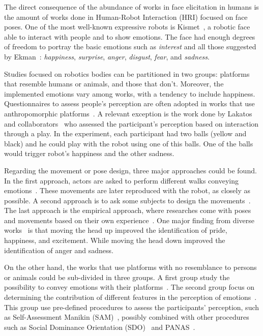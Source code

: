 The direct consequence of the abundance of works in face elicitation in humans is the amount of works done in Human-Robot Interaction (HRI) focused on face poses. One of the most well-known expressive robots is Kismet~\cite{Breazeal2002}, a robotic face able to interact with people and to show emotions. The face had enough degrees of freedom to portray the basic emotions such as \textit{interest} and all those suggested by Ekman~\cite{Ekman2004}: \textit{happiness}, \textit{surprise}, \textit{anger}, \textit{disgust}, \textit{fear}, and \textit{sadness}.

Studies focused on robotics bodies can be partitioned in two groups: platforms that resemble humans or animals, and those that don't. Moreover, the implemented emotions vary among works, with a tendency to include happiness. Questionnaires to assess people's perception are often adopted in works that use anthropomorphic platforms~\cite{Canamero2010,Beck2010,Li2011,Destephe2013b,Arras2012,Brown2014}. A relevant exception is the work done by Lakatos and collaborators~\cite{Lakatos2014} who assessed the participant's perception based on interaction through a play. In the experiment, each participant had two balls (yellow and black) and he could play with the robot using one of this balls. One of the balls would trigger robot's happiness and the other sadness. 

Regarding the movement or pose design, three major approaches could be found. In the first approach, actors are asked to perform different walks conveying emotions~\cite{Destephe2013b}. These movements are later reproduced with the robot, as closely as possible. A second approach is to ask some subjects to design the movements~\cite{Li2011}. The last approach is the empirical approach, where researches come with poses and movements based on their own experience~\cite{Canamero2010,Beck2010,Arras2012,Brown2014}. One major finding from diverse works~\cite{Canamero2010,Beck2010,Brown2014} is that moving the head up improved the identification of pride, happiness, and excitement. While moving the head down improved the identification of anger and sadness.  

On the other hand, the works that use platforms with no resemblance to persons or animals could be sub-divided in three groups. A first group study the possibility to convey emotions with their platforms~\cite{Arras2012, Novika2015, BarakovaL10}. The second group focus on determining the contribution of different features in the perception of emotions~\cite{Saerbeck2010,Barakova2013, Sharma2013, NAM2014}.
This group use pre-defined procedures to assess the participants' perception, such as Self-Assessment Manikin (SAM)~\cite{Lang2008}, possibly combined  with other procedures such as Social Dominance Orientation (SDO)~\cite{pratto1994social} and PANAS~\cite{WatsonClarkTellegen88}. 


